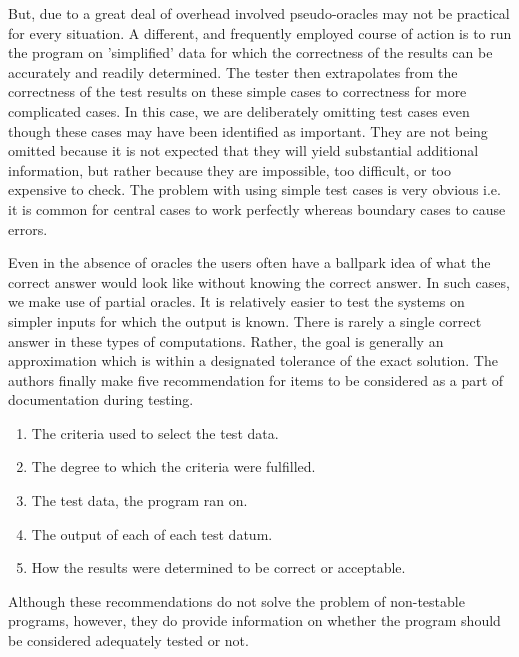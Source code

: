  But, due to a great deal of overhead involved pseudo-oracles may not be practical for every situation. 
A different, and frequently employed course of action is to run the program on 'simplified' data for which the correctness of the results can be accurately and readily determined. The tester then extrapolates from the correctness of the test results on these simple cases to correctness for more complicated cases. In this case, we are deliberately omitting test cases even though these cases may have been identified as important. They are not being omitted because it is not expected that they will yield substantial additional information, but rather because they are impossible, too difficult, or too expensive to check. The problem with using simple test cases is very obvious i.e. it is common for central cases to work perfectly whereas boundary cases to cause errors. 

Even in the absence of oracles the users often have a ballpark idea of what the correct answer would look like without knowing the correct answer. In such cases, we make use of partial oracles. It is relatively easier to test the systems on simpler inputs for which the output is known. There is rarely a single correct answer in these types of computations. Rather, the goal is generally an approximation which is within a designated tolerance of the exact solution. The authors finally make five recommendation for items to be considered as a part of documentation during testing.
\begin{enumerate}
  \item The criteria used to select the test data.
  \item The degree to which the criteria were fulfilled.
  \item The test data, the program ran on.
  \item The output of each of each test datum.
  \item How the results were determined to be correct or acceptable.
\end{enumerate}
Although these recommendations do not solve the problem of non-testable programs, however, they do provide information on whether the program should be considered adequately tested or not.

